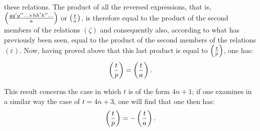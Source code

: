these relations. The product of all the reversed expressions, that is, $\left(\frac{gg'g''\ldots{}\times
hh'h''\ldots}{a}\right)$ or $\left(\frac{t}{a}\right)$, is therefore equal to the product of the second members of the
relations $(\zeta)$ and consequently also, according to what has previously been seen, equal to
the product of the second members of the relations $(\varepsilon)$. Now, having proved above that
this last product is equal to $\left(\frac{t}{p}\right)$, one has:
\[
\left(\frac{t}{p}\right)=\left(\frac{t}{a}\right).
\]
\par\indent
This result concerns the case in which $t$ is of the form $4n+1$; if one examines in a similar way
the case of $t=4n+3$, one will find that one then has:
\[
\left(\frac{t}{p}\right)=-\left(\frac{t}{a}\right).
\]
